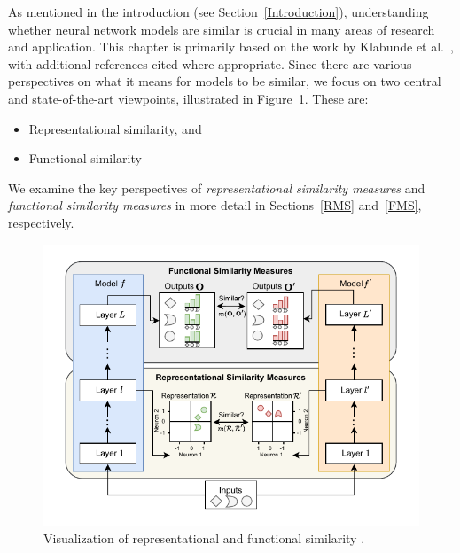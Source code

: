 As mentioned in the introduction (see Section~\ref{Introduction}), understanding whether neural network models are similar is crucial in many areas of research and application.
This chapter is primarily based on the work by Klabunde et al.~\cite{klabunde_similarity_2024}, with additional references cited where appropriate.
Since there are various perspectives on what it means for models to be similar, we focus on two central and state-of-the-art viewpoints, illustrated in Figure~\ref{fig:SimilarityOfNN}. These are:
\begin{itemize}
    \item Representational similarity, and
    \item Functional similarity
\end{itemize}

We examine the key perspectives of \textit{representational similarity measures} and \textit{functional similarity measures} in more detail in Sections~\ref{RMS} and~\ref{FMS}, respectively.



\begin{figure}[h]
    \centering
    \includegraphics[width=\linewidth]{Abschlussarbeit/Pictures/Similarity90Deg.drawio.pdf}
    \caption{Visualization of representational and functional similarity \cite{klabunde_similarity_2024}.}
    \label{fig:SimilarityOfNN}
\end{figure}

